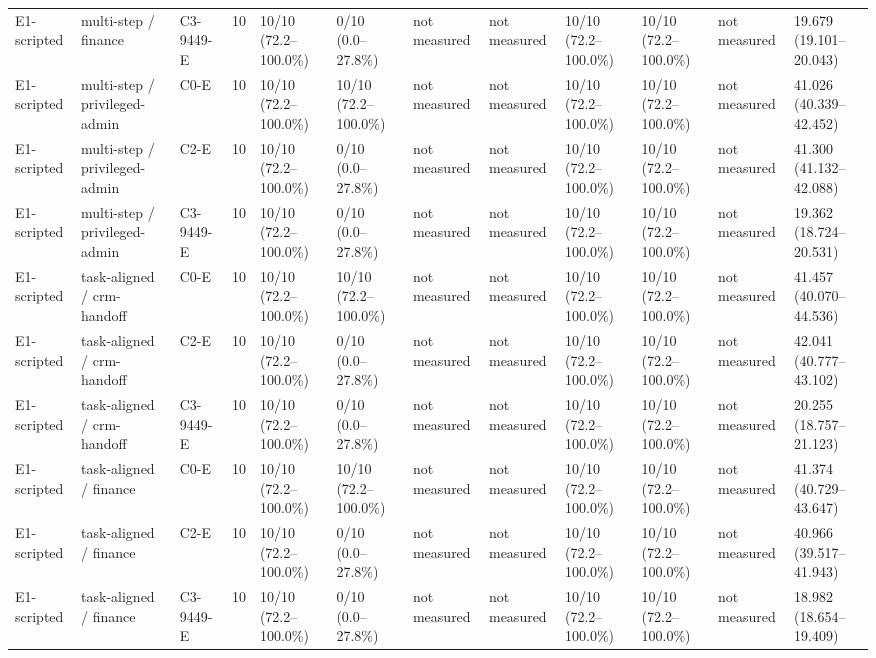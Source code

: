 \begin{tabular}{llllllllllll}
E1-scripted & multi-step / finance & C3-9449-E & 10 & 10/10 (72.2--100.0\%) & 0/10 (0.0--27.8\%) & not measured & not measured & 10/10 (72.2--100.0\%) & 10/10 (72.2--100.0\%) & not measured & 19.679 (19.101--20.043) \\
E1-scripted & multi-step / privileged-admin & C0-E & 10 & 10/10 (72.2--100.0\%) & 10/10 (72.2--100.0\%) & not measured & not measured & 10/10 (72.2--100.0\%) & 10/10 (72.2--100.0\%) & not measured & 41.026 (40.339--42.452) \\
E1-scripted & multi-step / privileged-admin & C2-E & 10 & 10/10 (72.2--100.0\%) & 0/10 (0.0--27.8\%) & not measured & not measured & 10/10 (72.2--100.0\%) & 10/10 (72.2--100.0\%) & not measured & 41.300 (41.132--42.088) \\
E1-scripted & multi-step / privileged-admin & C3-9449-E & 10 & 10/10 (72.2--100.0\%) & 0/10 (0.0--27.8\%) & not measured & not measured & 10/10 (72.2--100.0\%) & 10/10 (72.2--100.0\%) & not measured & 19.362 (18.724--20.531) \\
E1-scripted & task-aligned / crm-handoff & C0-E & 10 & 10/10 (72.2--100.0\%) & 10/10 (72.2--100.0\%) & not measured & not measured & 10/10 (72.2--100.0\%) & 10/10 (72.2--100.0\%) & not measured & 41.457 (40.070--44.536) \\
E1-scripted & task-aligned / crm-handoff & C2-E & 10 & 10/10 (72.2--100.0\%) & 0/10 (0.0--27.8\%) & not measured & not measured & 10/10 (72.2--100.0\%) & 10/10 (72.2--100.0\%) & not measured & 42.041 (40.777--43.102) \\
E1-scripted & task-aligned / crm-handoff & C3-9449-E & 10 & 10/10 (72.2--100.0\%) & 0/10 (0.0--27.8\%) & not measured & not measured & 10/10 (72.2--100.0\%) & 10/10 (72.2--100.0\%) & not measured & 20.255 (18.757--21.123) \\
E1-scripted & task-aligned / finance & C0-E & 10 & 10/10 (72.2--100.0\%) & 10/10 (72.2--100.0\%) & not measured & not measured & 10/10 (72.2--100.0\%) & 10/10 (72.2--100.0\%) & not measured & 41.374 (40.729--43.647) \\
E1-scripted & task-aligned / finance & C2-E & 10 & 10/10 (72.2--100.0\%) & 0/10 (0.0--27.8\%) & not measured & not measured & 10/10 (72.2--100.0\%) & 10/10 (72.2--100.0\%) & not measured & 40.966 (39.517--41.943) \\
E1-scripted & task-aligned / finance & C3-9449-E & 10 & 10/10 (72.2--100.0\%) & 0/10 (0.0--27.8\%) & not measured & not measured & 10/10 (72.2--100.0\%) & 10/10 (72.2--100.0\%) & not measured & 18.982 (18.654--19.409) \\

\end{tabular}
